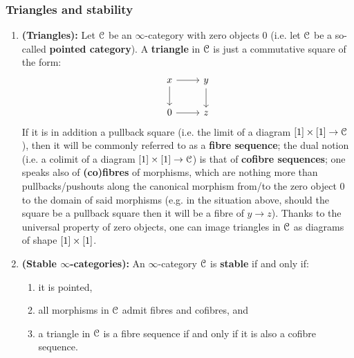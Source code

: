             \subsubsection{Triangles and stability}
                \begin{definition} \label{def: stable_infinity_categories} 
                    \noindent
                    \begin{enumerate}
                        \item \textbf{(Triangles):} Let $\mathcal{C}$ be an $\infty$-category with zero objects $0$ (i.e. let $\mathcal{C}$ be a so-called \textbf{pointed category}). A \textbf{triangle} in $\mathcal{C}$ is just a commutative square of the form:
                            $$
                                \begin{tikzcd}
                                	x & y \\
                                	0 & z
                                	\arrow[from=1-1, to=2-1]
                                	\arrow[from=1-1, to=1-2]
                                	\arrow[from=1-2, to=2-2]
                                	\arrow[from=2-1, to=2-2]
                                \end{tikzcd}
                            $$
                        If it is in addition a pullback square (i.e. the limit of a diagram $[1] \x [1] \to \C$), then it will be commonly referred to as a \textbf{fibre sequence}; the dual notion (i.e. a colimit of a diagram $[1] \x [1] \to \C$) is that of \textbf{cofibre sequences}; one speaks also of \textbf{(co)fibres} of morphisms, which are nothing more than pullbacks/pushouts along the canonical morphism from/to the zero object $0$ to the domain of said morphisms (e.g. in the situation above, should the square be a pullback square then it will be a fibre of $y \to z$). Thanks to the universal property of zero objects, one can image triangles in $\mathcal{C}$ as diagrams of shape $[1] \x [1]$.
                        \item \textbf{(Stable $\infty$-categories):} An $\infty$-category $\mathcal{C}$ is \textbf{stable} if and only if:
                            \begin{enumerate}
                                \item it is pointed,
                                \item all morphisms in $\mathcal{C}$ admit fibres and cofibres, and
                                \item a triangle in $\mathcal{C}$ is a fibre sequence if and only if it is also a cofibre sequence.
                            \end{enumerate}
                    \end{enumerate}
                \end{definition}
